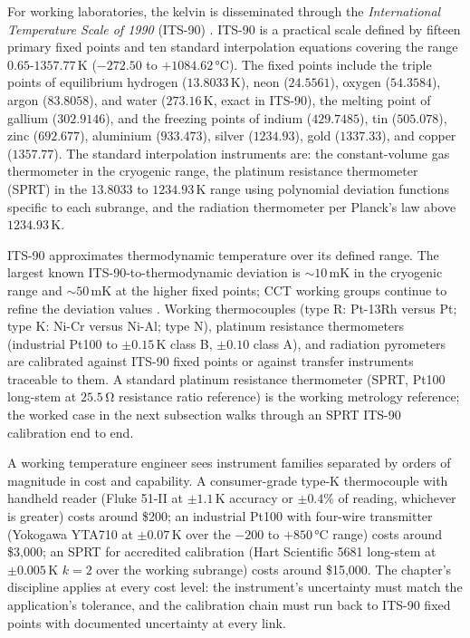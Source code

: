 For working laboratories, the kelvin is disseminated through the
\textit{International Temperature Scale of 1990} (ITS-90)
\cite{web:bipm-cct-its90}. ITS-90 is a practical scale defined by
fifteen primary fixed points and ten standard interpolation
equations covering the range $0.65$-$1357.77\,\si{\kelvin}$
($-272.50$ to $+1084.62\,\si{\degreeCelsius}$). The fixed points
include the triple points of equilibrium hydrogen
($13.8033\,\si{\kelvin}$), neon ($24.5561$), oxygen ($54.3584$),
argon ($83.8058$), and water ($273.16\,\si{\kelvin}$, exact in
ITS-90), the melting point of gallium ($302.9146$), and the
freezing points of indium ($429.7485$), tin ($505.078$), zinc
($692.677$), aluminium ($933.473$), silver ($1234.93$), gold
($1337.33$), and copper ($1357.77$). The standard interpolation
instruments are: the constant-volume gas thermometer in the
cryogenic range, the platinum resistance thermometer (SPRT) in
the $13.8033$ to $1234.93\,\si{\kelvin}$ range using polynomial
deviation functions specific to each subrange, and the radiation
thermometer per Planck's law above $1234.93\,\si{\kelvin}$.

ITS-90 approximates thermodynamic temperature over its defined
range. The largest known ITS-90-to-thermodynamic deviation is
$\sim 10\,\si{\milli\kelvin}$ in the cryogenic range and
$\sim 50\,\si{\milli\kelvin}$ at the higher fixed points; CCT
working groups continue to refine the deviation values
\cite{web:bipm-cct-its90}. Working thermocouples (type R: Pt-13Rh
versus Pt; type K: Ni-Cr versus Ni-Al; type N), platinum
resistance thermometers (industrial Pt100 to $\pm 0.15\,\si{\kelvin}$
class B, $\pm 0.10$ class A), and radiation pyrometers are
calibrated against ITS-90 fixed points or against transfer
instruments traceable to them. A standard platinum resistance
thermometer (SPRT, Pt100 long-stem at $25.5\,\si{\ohm}$ resistance
ratio reference) is the working metrology reference; the worked
case in the next subsection walks through an SPRT ITS-90
calibration end to end.

A working temperature engineer sees instrument families separated
by orders of magnitude in cost and capability. A consumer-grade
type-K thermocouple with handheld reader (Fluke 51-II at
$\pm 1.1\,\si{\kelvin}$ accuracy or $\pm 0.4\%$ of reading,
whichever is greater) costs around \$200; an industrial Pt100
with four-wire transmitter (Yokogawa YTA710 at $\pm 0.07\,\si{
\kelvin}$ over the $-200$ to $+850\,\si{\degreeCelsius}$ range)
costs around \$3{,}000; an SPRT for accredited calibration
(Hart Scientific 5681 long-stem at $\pm 0.005\,\si{\kelvin}$
$k = 2$ over the working subrange) costs around \$15{,}000. The
chapter's discipline applies at every cost level: the instrument's
uncertainty must match the application's tolerance, and the
calibration chain must run back to ITS-90 fixed points with
documented uncertainty at every link.

